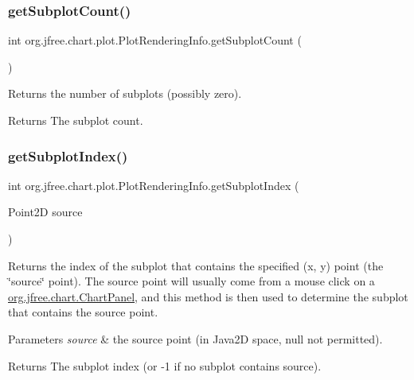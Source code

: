 \subsubsection{\texorpdfstring{get\+Subplot\+Count()}{getSubplotCount()}}
{\footnotesize\ttfamily int org.\+jfree.\+chart.\+plot.\+Plot\+Rendering\+Info.\+get\+Subplot\+Count (\begin{DoxyParamCaption}{ }\end{DoxyParamCaption})}

Returns the number of subplots (possibly zero).

\begin{DoxyReturn}{Returns}
The subplot count. 
\end{DoxyReturn}
\mbox{\label{classorg_1_1jfree_1_1chart_1_1plot_1_1_plot_rendering_info_aeaedb746d2b0ac4712620f12e82c0afa}} 
\subsubsection{\texorpdfstring{get\+Subplot\+Index()}{getSubplotIndex()}}
{\footnotesize\ttfamily int org.\+jfree.\+chart.\+plot.\+Plot\+Rendering\+Info.\+get\+Subplot\+Index (\begin{DoxyParamCaption}\item[{Point2D}]{source }\end{DoxyParamCaption})}

Returns the index of the subplot that contains the specified (x, y) point (the \char`\"{}source\char`\"{} point). The source point will usually come from a mouse click on a \mbox{\hyperlink{classorg_1_1jfree_1_1chart_1_1_chart_panel}{org.\+jfree.\+chart.\+Chart\+Panel}}, and this method is then used to determine the subplot that contains the source point.


\begin{DoxyParams}{Parameters}
{\em source} & the source point (in Java2D space, {\ttfamily null} not permitted).\\
\hline
\end{DoxyParams}
\begin{DoxyReturn}{Returns}
The subplot index (or -\/1 if no subplot contains {\ttfamily source}). 
\end{DoxyReturn}
\mbox{\label{classorg_1_1jfree_1_1chart_1_1plot_1_1_plot_rendering_info_a5ed7e19543067de91316df65cd079f53}} 
